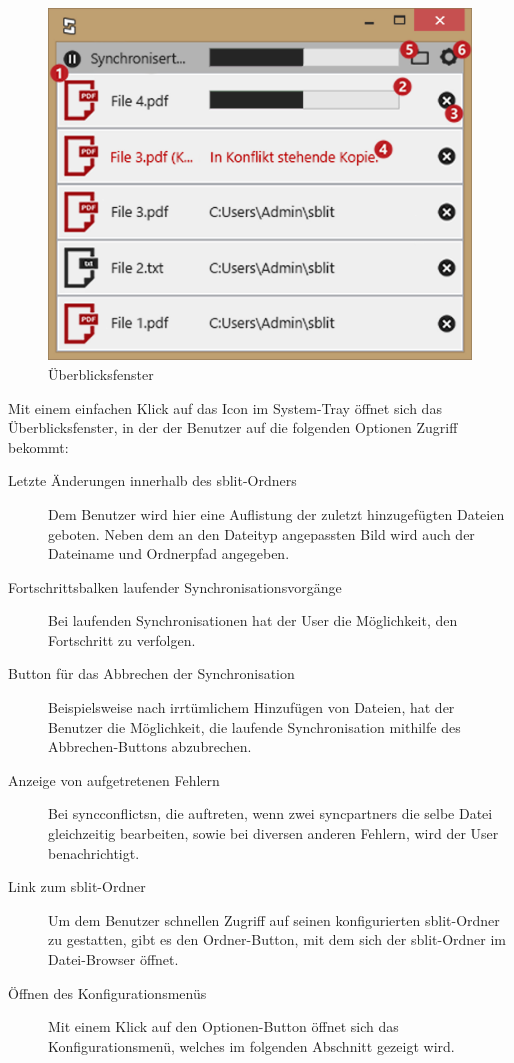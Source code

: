 \begin{figure}[H]
	\centering
	\includegraphics[scale=0.7]{images/ueberblicksfenster.png}
  \caption{Überblicksfenster}
	\label{ueberblicksfenster}
\end{figure}

Mit einem einfachen Klick auf das Icon im System-Tray öffnet sich das Überblicksfenster, in der der
Benutzer auf die folgenden Optionen Zugriff bekommt:

\begin{description}

	\item[{Letzte Änderungen innerhalb des sblit-Ordners}]
		Dem Benutzer wird hier eine Auflistung der zuletzt hinzugefügten Dateien
		geboten. Neben dem an den Dateityp angepassten Bild wird auch der Dateiname
		und Ordnerpfad angegeben.

	\item[{Fortschrittsbalken laufender Synchronisationsvorgänge}]
		Bei laufenden Synchronisationen hat der User die Möglichkeit, den
		Fortschritt zu verfolgen.

	\item[{Button für das Abbrechen der Synchronisation}]
	  Beispielsweise nach irrtümlichem Hinzufügen von Dateien, hat der Benutzer die
		Möglichkeit, die laufende Synchronisation mithilfe des Abbrechen-Buttons
		abzubrechen.

	\item[{Anzeige von aufgetretenen Fehlern}]
		Bei \glspl{syncconflict}n, die auftreten, wenn zwei \glspl{syncpartner} die
		selbe Datei gleichzeitig bearbeiten, sowie bei diversen anderen Fehlern,
		wird der User benachrichtigt.

	\item[{Link zum sblit-Ordner}]
		Um dem Benutzer schnellen Zugriff auf seinen konfigurierten sblit-Ordner zu
		gestatten, gibt es den Ordner-Button, mit dem sich der sblit-Ordner im
		Datei-Browser öffnet.

	\item[{Öffnen des Konfigurationsmenüs}]
		Mit einem Klick auf den Optionen-Button öffnet sich das Konfigurationsmenü,
		welches im folgenden Abschnitt gezeigt wird.
\end{description}

